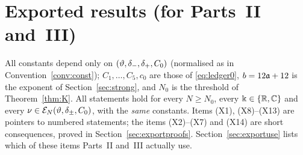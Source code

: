 \section{Exported results (for Parts~II and~III)}\label{sec:export}
All constants depend only on $(\vartheta,\delta_-,\delta_+,C_0)$ (normalised as in Convention~\ref{conv:const}); $C_1,\dots,C_5,c_0$ are those of \eqref{eq:ledger0}, $b=12\mathfrak{a}+12$ is the exponent of Section~\ref{sec:strong}, and $N_0$ is the threshold of Theorem~\ref{thm:K}.
All statements hold for every $N\ge N_0$, every $\Bbbk\in\{\mathbb{R},\mathbb{C}\}$ and every $\nu\in\mathcal E_N(\vartheta,\delta_\pm,C_0)$, with the \emph{same} constants. Items (X1), (X8)--(X13) are pointers to numbered statements; the items (X2)--(X7) and (X14) are short consequences, proved in Section~\ref{sec:exportproofs}.
Section~\ref{sec:exportuse} lists which of these items Parts~II and~III actually use.

